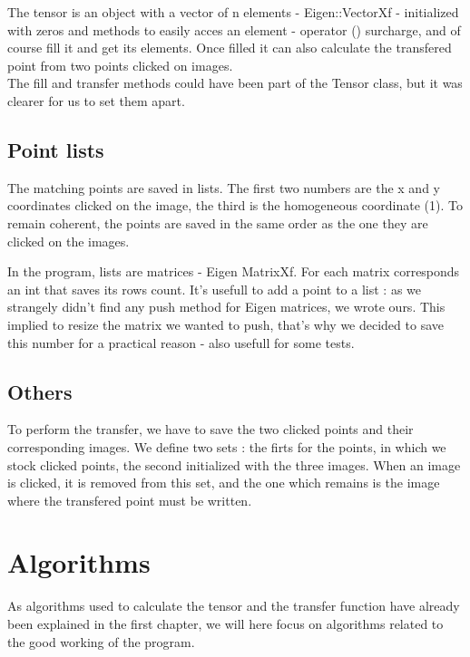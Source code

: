 \documentclass[a4paper,10pt]{report}
\begin{document}
The tensor is an object with a vector of n elements - Eigen::VectorXf - initialized with zeros
and methods to easily acces an element - operator () surcharge, and of course fill it and get its elements.
Once filled it can also calculate the transfered point from two points clicked on images.
\\

The fill and transfer methods could have been part of the Tensor class, but it was clearer
for us to set them apart.
\\

\subsection{Point lists}

The matching points are saved in lists. The first two numbers are the x and y coordinates
clicked on the image, the third is the homogeneous coordinate (1). To remain coherent,
the points are saved in the same order as the one they are clicked on the images.

In the program, lists are matrices - Eigen MatrixXf. For each matrix corresponds an int that 
saves its rows count. It's usefull to add a point to a list : as we strangely didn't find
any push method for Eigen matrices, we wrote ours. This implied to resize the matrix we wanted
to push, that's why we decided to save this number for a practical reason - also usefull for some tests.
\\

\subsection{Others}

To perform the transfer, we have to save the two clicked points and their corresponding images.
We define two sets : the firts for the points, in which we stock clicked points, the second initialized with
the three images. When an image is clicked, it is removed from this set, and the one which remains
is the image where the transfered point must be written.
\\

\section{Algorithms}
As algorithms used to calculate the tensor and the transfer function have already been explained
in the first chapter, we will here focus on algorithms related to the good working of the program.
\\
\end{document}
